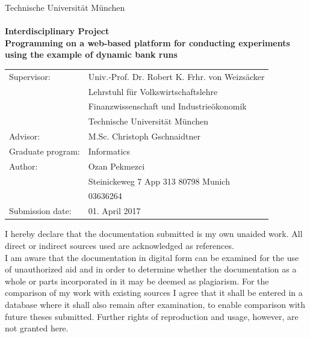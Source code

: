 \begin{titlepage}
\begin{center}
{\Huge Technische Universit\"at M\"unchen} 
\\
\vspace*{1cm}
{\huge {}} 
\\ 
\vspace*{2cm}
{\Huge {\bf Interdisciplinary Project}}\\
\vspace*{1cm}
{\Large {\bf Programming on a web-based platform for conducting experiments using the example of dynamic bank runs }}\\
\vspace*{4cm}
{ 
\begin{tabular}{ll}
Supervisor: & Univ.-Prof. Dr. Robert K. Frhr. von Weizs\"{a}cker \\
			& Lehrstuhl f\"{u}r Volkswirtschaftslehre\\
			& Finanzwissenschaft und Industrie\"{o}konomik\\
			& Technische Universit\"{a}t M\"{u}nchen \vspace*{0.3cm} \\ 
Advisor: & M.Sc. Christoph Gschnaidtner 		\vspace*{0.3cm}  \\
Graduate program: & Informatics		\vspace*{0.3cm} \\ 
Author: & Ozan Pekmezci \\
		& Steinickeweg 7 App 313 80798 Munich \\
		& 03636264 \vspace*{0.3cm} \\
Submission date: & 01. April 2017
\end{tabular}
}

\end{center}
\end{titlepage}




\thispagestyle{plain}
\vspace*{11cm}
\noindent
I hereby declare that the documentation submitted is my own unaided work. All direct or indirect sources used are acknowledged as references. \\

I am aware that the documentation in digital form can be examined for the use of unauthorized aid and in order to determine whether the documentation as a whole or parts incorporated in it may be deemed as plagiarism. For the comparison of my work with existing sources I agree that it shall be entered in a database where it shall also remain after examination, to enable comparison with future theses submitted. Further rights of reproduction and usage, however, are not granted here.\\
 
